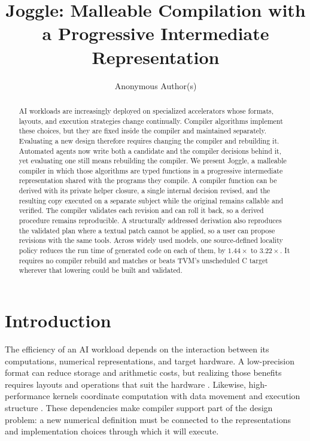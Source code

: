 \documentclass[sigplan,anonymous,review]{acmart}
\title[Joggle]{Joggle: Malleable Compilation with a Progressive Intermediate Representation}
\author{Anonymous Author(s)}
\affiliation{\institution{Anonymous}}
\begin{document}
\begin{abstract}
AI workloads are increasingly deployed on specialized accelerators whose formats,
layouts, and execution strategies change continually. Compiler algorithms
implement these choices, but they are fixed inside the compiler and maintained
separately. Evaluating a new design therefore requires changing the compiler and
rebuilding it. Automated agents now write both a candidate and the compiler
decisions behind it, yet evaluating one still means rebuilding the compiler. We present Joggle, a malleable compiler in
which those algorithms are typed functions in a progressive intermediate
representation shared with the programs they compile. A compiler function can be
derived with its private helper closure, a single internal decision revised, and
the resulting copy executed on a separate subject while the original remains
callable and verified. The compiler validates each revision and can roll it back,
so a derived procedure remains reproducible. A structurally addressed derivation also
reproduces the validated plan where a textual patch cannot be applied, so a user
can propose revisions with the same tools. Across widely used models, one source-defined locality policy
reduces the run time of generated code on each of them, by $1.44\times$ to
$3.22\times$. It requires no compiler rebuild and matches or beats TVM's
unscheduled C target wherever that lowering could be built and validated.
\end{abstract}
\maketitle
\section{Introduction}
The efficiency of an AI workload depends on the interaction between its
computations, numerical representations, and target hardware. A low-precision
format can reduce storage and arithmetic costs, but realizing those benefits
requires layouts and operations that suit the hardware
\cite{rouhani2023microscaling,wang2024ladder}. Likewise, high-performance
kernels coordinate computation with data movement and execution structure
\cite{wang2025tilelang}. These dependencies make compiler support part of
the design problem: a new numerical definition must be connected to the
representations and implementation choices through which it will execute.
\end{document}
